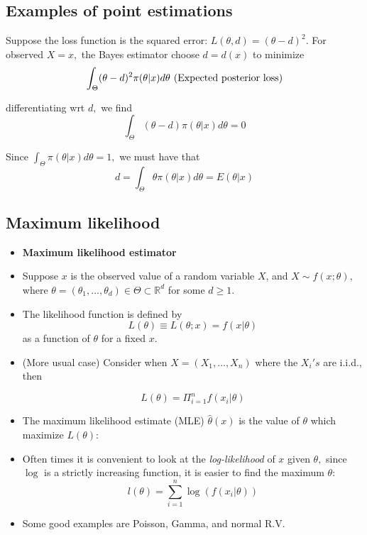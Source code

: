 \documentclass[12pt]{report} \addtolength{\textheight}{2in}
\newcommand{\Realnum}{\mathbb{R}}
\begin{document}
\subsection*{Examples of point estimations}
\begin{description}
\item[Case 1] Suppose the loss function is the squared error: $L(\theta, d)=(\theta-d)^2$. For observed $X=x,$ the Bayes estimator choose $d=d(x)$ to minimize
\begin{displaymath}
\int_{\Theta} (\theta-d)^2\pi(\theta|x) d\theta \text{\hspace{.2 pt} (Expected posterior loss)}
\end{displaymath}
\item differentiating wrt $d,$ we find
\begin{displaymath}
\int_{\Theta} (\theta-d) \pi(\theta|x) d\theta =0 
\end{displaymath}
\item Since $\int_{\Theta} \pi(\theta|x) d\theta =1,$ we must have that 
\begin{displaymath}
d=\int_{\Theta} \theta \pi(\theta|x) d\theta = E(\theta|x)
\end{displaymath}
\end{description}

\subsection*{Maximum likelihood}
\begin{itemize}
\item[] \textbf{Maximum likelihood estimator}
\item
Suppose $x$ is the observed value of a random variable $X$, and $X \sim f(x;\theta),$ where $\theta =(\theta_1,\dots,\theta_d)\in\Theta \subset \Realnum^{d}$ for some $d \geq 1.$
\item The likelihood function is defined by
\begin{displaymath}
L(\theta) \equiv  L(\theta; x) = f(x|\theta)
\end{displaymath}
as a function of $\theta$ for a fixed $x.$
\item (More usual case) Consider when $X=(X_1,\dots,X_n)$ where the $X_i's $ are i.i.d., then

\begin{displaymath}
\boxed
{
L(\theta) = \Pi_{i=1}^{n}f(x_i|\theta)
}
\end{displaymath}

\item The maximum likelihood estimate (MLE) $\hat{\theta}(x)$ is the value of $\theta$ which maximize $L(\theta):$
\item Often times it is convenient to look at the \textit{log-likelihood} of $x$ given $\theta,$ since $\log$ is a strictly increasing function, it is easier to find the maximum $\theta:$
\begin{displaymath}
l(\theta)=\sum_{i=1}^{n} \log (f(x_i|\theta))
\end{displaymath}
\item Some good examples are Poisson, Gamma, and normal R.V.
\end{itemize}
\end{document}
